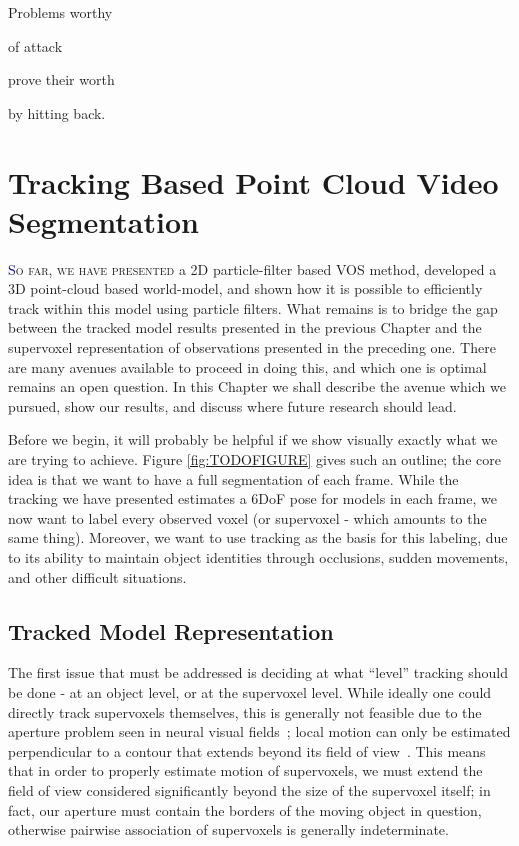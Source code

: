 \begin{savequote}[75mm]
Problems worthy

of attack

prove their worth

by hitting back. 
\end{savequote}


\chapter{Tracking Based Point Cloud Video Segmentation}
\label{Chap:TrackingBasedSegmentation}
\lettrine[lines=3, loversize=0.3]{\textcolor{DarkBlue}S}{o far, we have presented} a 2D particle-filter based VOS method, developed a 3D point-cloud based world-model, and shown how it is possible to efficiently track within this model using particle filters. What remains is to bridge the gap between the tracked model results presented in the previous Chapter and the supervoxel representation of observations presented in the preceding one. There are many avenues available to proceed in doing this, and which one is optimal remains an open question. In this Chapter we shall describe the avenue which we pursued, show our results, and discuss where future research should lead.

Before we begin, it will probably be helpful if we show visually exactly what we are trying to achieve. Figure \ref{fig:TODOFIGURE} gives such an outline; the core idea is that we want to have a full segmentation of each frame.  While the tracking we have presented estimates a 6DoF pose for models in each frame, we now want to label every observed voxel (or supervoxel - which amounts to the same thing). Moreover, we want to use tracking as the basis for this labeling, due to its ability to maintain object identities through occlusions, sudden movements, and other difficult situations. 



\section{Tracked Model Representation}
The first issue that must be addressed is deciding at what ``level'' tracking should be done - at an object level, or at the supervoxel level. While ideally one could directly track supervoxels themselves, this is generally not feasible due to the aperture problem seen in neural visual fields~\cite{MarrApertureProblem}; local motion can only be estimated perpendicular to a contour that extends beyond its field of view~\cite{shimojo1989}. This means that in order to properly estimate motion of supervoxels, we must extend the field of view considered significantly beyond the size of the supervoxel itself; in fact, our aperture must contain the borders of the moving object in question, otherwise pairwise association of supervoxels is generally indeterminate. 

